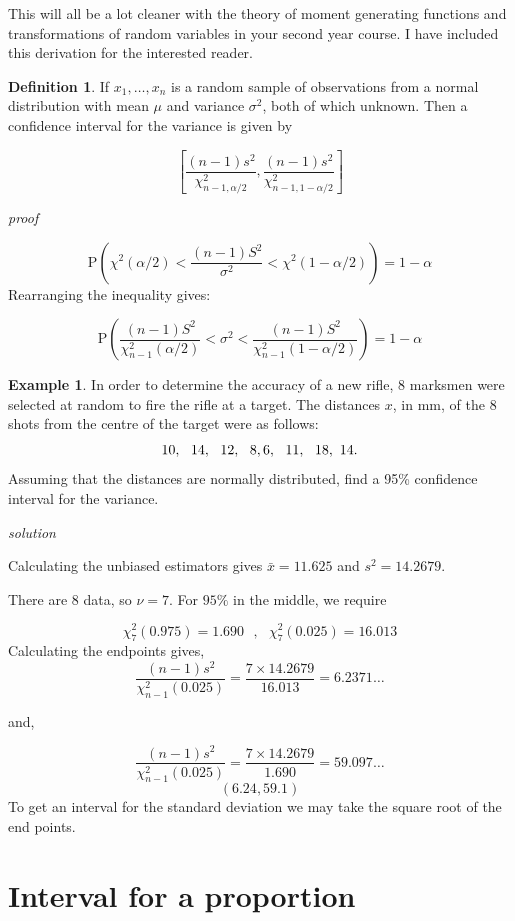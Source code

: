 \documentclass[
]{book}
\theoremstyle{definition}
\newtheorem{definition}{Definition}[chapter]
\theoremstyle{definition}
\newtheorem{example}{Example}[chapter]
\theoremstyle{definition}
\theoremstyle{definition}
\theoremstyle{remark}
\begin{document}
This will all be a lot cleaner with the theory of moment generating functions and transformations of random variables in your second year course. I have included this derivation for the interested reader.

\begin{definition}
If \(x_1,\ldots,x_n\) is a random sample of observations from a normal distribution with mean \(\mu\) and variance \(\sigma^2\), both of which unknown. Then a confidence interval for the variance is given by

\[\left[ \frac{(n-1)s^2}{\chi^2_{n-1,\alpha / 2}},\frac{(n-1)s^2}{\chi^2_{n-1,1-\alpha / 2}}\right]\]
\end{definition}

\emph{proof}

\[\text{P}\left( \chi^2(\alpha / 2)<\frac{(n-1)S^2}{\sigma^2} < \chi^2(1-\alpha/2) \right) = 1-\alpha \]
Rearranging the inequality gives:

\[\text{P}\left( \frac{(n-1)S^2}{\chi^2_{n-1}(\alpha / 2)}<\sigma^2 < \frac{(n-1)S^2}{\chi^2_{n-1}(1-\alpha / 2)} \right) = 1-\alpha \]

\begin{example}
In order to determine the accuracy of a new rifle, \(8\) marksmen were selected at random to fire the
rifle at a target. The distances \(x\), in mm, of the \(8\) shots from the centre of the target were as follows:
\[10, \ \ 14, \ \ 12,\ \ 8, \\ 6,  \ \ 11,  \ \ 18, \ 14.\]
Assuming that the distances are normally distributed, find a 95\% confidence interval for the variance.
\end{example}

\emph{solution}

Calculating the unbiased estimators gives \(\bar{x}=11.625\) and \(s^2 = 14.2679\).

There are \(8\) data, so \(\nu = 7\). For \(95\%\) in the middle, we require

\[\chi^2_7 (0.975) = 1.690 \ \ \ ,\ \ \ \chi^2_7(0.025)=16.013\]
Calculating the endpoints gives,
\[\frac{(n-1)s^2}{\chi^2_{n-1}(0.025)}= \frac{7\times 14.2679}{16.013} = 6.2371\ldots\]

and,

\[\frac{(n-1)s^2}{\chi^2_{n-1}(0.025)}= \frac{7\times 14.2679}{1.690} = 59.097\ldots\]
\[(6.24,59.1)\]
To get an interval for the standard deviation we may take the square root of the end points.

\hypertarget{interval-for-a-proportion}{%
\section{Interval for a proportion}\label{interval-for-a-proportion}}
\end{document}
